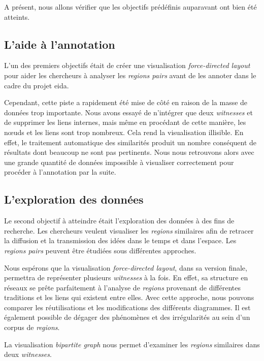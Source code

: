 A présent, nous allons vérifier que les objectifs prédéfinis auparavant ont bien été atteints. 

\subsection{L'aide à l'annotation}

L'un des premiers objectifs était de créer une visualisation \textit{force-directed layout} pour aider les chercheurs à analyser les \textit{regions pairs} avant de les annoter dans le cadre du projet \gls{eida}.

Cependant, cette piste a rapidement été mise de côté en raison de la masse de données trop importante. Nous avons essayé de n'intégrer que deux \textit{witnesses} et de supprimer les liens internes, mais même en procédant de cette manière, les nœuds et les liens sont trop nombreux. Cela rend la visualisation illisible. En effet, le traitement automatique des similarités produit un nombre conséquent de résultats dont beaucoup ne sont pas pertinents. Nous nous retrouvons alors avec une grande quantité de données impossible à visualiser correctement pour procéder à l'annotation par la suite. 

\subsection{L'exploration des données}

Le second objectif à atteindre était l'exploration des données à des fins de recherche. Les chercheurs veulent visualiser les \textit{regions} similaires afin de retracer la diffusion et la transmission des idées dans le temps et dans l'espace. Les \textit{regions pairs} peuvent être étudiées sous différentes approches. 

Nous espérons que la visualisation \textit{force-directed layout}, dans sa version finale, permettra de représenter plusieurs \textit{witnesses} à la fois. En effet, sa structure en réseaux se prête parfaitement à l'analyse de \textit{regions} provenant de différentes traditions et les liens qui existent entre elles. Avec cette approche, nous pouvons comparer les réutilisations et les modifications des différents diagrammes. Il est également possible de dégager des phénomènes et des irrégularités au sein d'un corpus de \textit{regions}.

La visualisation \textit{bipartite graph} nous permet d'examiner les \textit{regions} similaires dans deux \textit{witnesses}.

